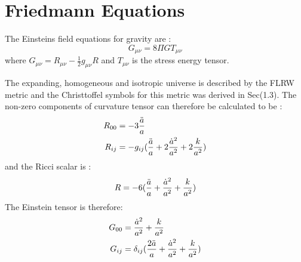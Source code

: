 \documentclass[12pt,a4paper,oneside]{book}
\begin{document}
\section{Friedmann Equations}
The Einsteins field equations for gravity are :
\begin{equation}
    G_{\mu\nu} = 8\Pi GT_{\mu\nu}
\end{equation}
where $ G_{\mu\nu} = R_{\mu\nu} - \frac{1}{2} g_{\mu\nu}R $ and $T_{\mu\nu}$ is the stress energy tensor.
\par The expanding, homogeneous and isotropic universe is described by the FLRW metric and the Christtoffel symbols for this metric was derived in Sec(1.3). The non-zero components of curvature tensor can therefore be calculated to be :
\begin{align}
    R_{00} &= -3\frac{\Ddot{a}}{a}\\
    R_{ij} &= -g_{ij}(\frac{\Ddot{a}}{a}+2\frac{\dot{a}^2}{a^2}+2\frac{k}{a^2}) 
\end{align}
and the Ricci scalar is :
\begin{equation}
    R = -6 (\frac{\Ddot{a}}{a}+\frac{\dot{a}^2}{a^2}+\frac{k}{a^2})  
\end{equation}
The Einstein tensor is therefore:
\begin{align}
    G_{00} &= \frac{\dot{a}^2}{a^2}+\frac{k}{a^2} \\
    G_{ij} &= \delta_{ij}(\frac{2\Ddot{a}}{a}+\frac{\dot{a}^2}{a^2}+\frac{k}{a^2}) 
\end{align}
\end{document}
